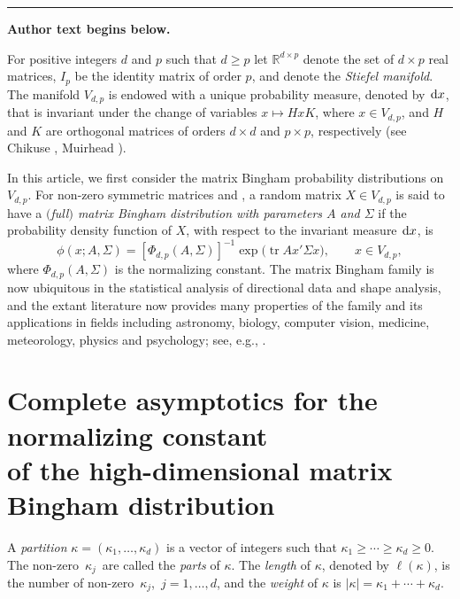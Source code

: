\documentclass[11pt]{article}
\numberwithin{equation}{section}
\numberwithin{equation}{section}
\def\R {\mathbb{R}}
\def\dd {\hskip1pt\mathrm{d}}
\def\tr {\mathop{\mathrm{tr}}}
\begin{document}
\medskip\hrule\medskip\noindent\textbf{Author text begins below.}\par
\setcounter{section}{1}
For positive integers $d$ and $p$ such that $d \ge p$ let $\R^{d \times p}$ denote the set of $d \times p$ real matrices, $I_p$ be the identity matrix of order $p$, and \smash{$V_{d,p} = \bigl\{x \in \R^{d \times p} \mid x'x = I_p\bigr\}$} denote the \textit{Stiefel manifold}. The manifold $V_{d,p}$ is endowed with a unique probability measure, denoted by $\dd x$, that is invariant under the change of variables $x \mapsto HxK$, where $x \in V_{d,p}$, and $H$ and $K$ are orthogonal matrices of orders $d \times d$ and $p \times p$, respectively (see Chikuse \cite[p.~16]{Chikuse}, Muirhead \cite[p.~70]{Muirhead}).

In this article, we first consider the matrix Bingham probability distributions on $V_{d,p}$. For non-zero symmetric matrices \smash{$A \in \R^{p \times p}$} and \smash{$\Sigma \in \R^{d \times d}$}, a random matrix $X \in V_{d,p}$ is said to have a {\it $($full$)$ matrix Bingham distribution with parameters $A$ and $\Sigma$} if the probability density function of $X$, with respect to the invariant measure $\dd x$, is
\begin{equation}
\label{eq_mBingham_pdf}
\phi(x;A,\Sigma) = [\Phi_{d,p}(A,\Sigma)]^{-1} \exp\bigl(\tr Ax'\Sigma x\bigr), \qquad x \in V_{d,p},
\end{equation}
where $\Phi_{d,p}(A,\Sigma)$ is the normalizing constant. The matrix Bingham family is now ubiquitous in the statistical analysis of directional data and shape analysis, and the extant literature now provides many properties of the family and its applications in fields including astronomy, biology, computer vision, medicine, meteorology, physics and psychology; see, e.g., \cite{BinghamCR,Chikuse,Dryden,JuppMardia2,KhatriMardia,KumeWood,KumePrestonWood,MardiaJupp,Prentice}.


\section[Complete asymptotics for the normalizing constant of the high-dimensional matrix Bingham distribution]{Complete asymptotics for the normalizing constant\\ of the high-dimensional matrix Bingham distribution}
\label{sec_matrix_bingham}

A \textit{partition} $\kappa = (\kappa_1,\ldots,\kappa_d)$ is a vector of integers such that $\kappa_1 \ge \cdots \ge \kappa_d \ge 0$. The non-zero~$\kappa_j$~are called the \textit{parts} of $\kappa$. The \textit{length} of $\kappa$, denoted by $\ell(\kappa)$, is the number of non-zero~$\kappa_j$,~$j=1,\ldots,d$, and the \textit{weight} of $\kappa$ is $|\kappa| = \kappa_1+\cdots+\kappa_d$.
\end{document}
